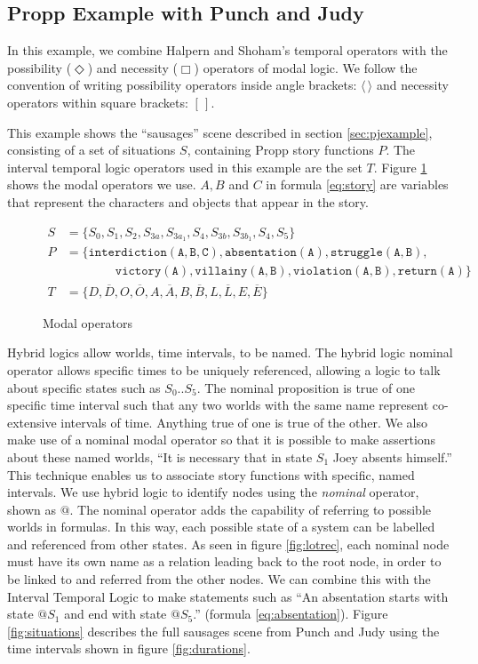 \documentclass{llncs}
\begin{document}
\subsection{Propp Example with Punch and Judy}

In this example, we combine Halpern and Shoham's temporal operators with the possibility ($\Diamond$) and necessity ($\Box$) operators of modal logic. We follow the convention of writing possibility operators inside angle brackets: $\langle \, \rangle$ and necessity operators within square brackets: $[ \, ]$.

This example shows the ``sausages'' scene described in section \ref{sec:pjexample}, consisting of a set of situations $S$, containing Propp story functions $P$. The interval temporal logic operators used in this example are the set $T$. Figure \ref{fig:operators} shows the modal operators we use. $A, B$ and $C$ in formula \ref{eq:story} are variables that represent the characters and objects that appear in the story.

\begin{figure}
\begin{align}
    S &= \{S_0, S_1, S_2, S_{3a}, S_{3a_1}, S_4, S_{3b}, S_{3b_1}, S_4, S_5\}\\
    P &= \{\mathtt{interdiction(A, B, C), absentation(A), struggle(A, B),}\nonumber\\
  &\qquad\qquad\mathtt{victory(A), villainy(A, B), violation(A, B), return(A)}\}\label{eq:story}\\
  T &= \{D, \overline{D}, O, \overline{O}, A, \overline{A}, B, \overline{B}, L, \overline{L}, E, \overline{E}\}
\end{align}
\caption{Modal operators}\label{fig:operators}
\end{figure}
Hybrid logics allow worlds, time intervals, to be named. The hybrid logic nominal operator allows specific times to be uniquely referenced, allowing a logic to talk about specific states such as $S_0..S_5$. The nominal proposition is true of one specific time interval such that any two worlds with the same name represent co-extensive intervals of time. Anything true of one is true of the other.
We also make use of a nominal modal operator so that it is possible to make assertions about these named worlds, ``It is necessary that in state $S_1$ Joey absents himself.'' This technique enables us to associate story functions with specific, named intervals.
We use hybrid logic to identify nodes using the \emph{nominal} operator, shown as $@$. The nominal operator adds the capability of referring to possible worlds in formulas. In this way, each possible state of a system can be labelled and referenced from other states. As seen in figure \ref{fig:lotrec}, each nominal node must have its own name as a relation leading back to the root node, in order to be linked to and referred from the other nodes.
We can combine this with the Interval Temporal Logic to make statements such as ``An absentation starts with state $@S_1$ and end with state $@S_5$.'' (formula \ref{eq:absentation}).
Figure \ref{fig:situations} describes the full sausages scene from Punch and Judy using the time intervals shown in figure \ref{fig:durations}.
\end{document}
